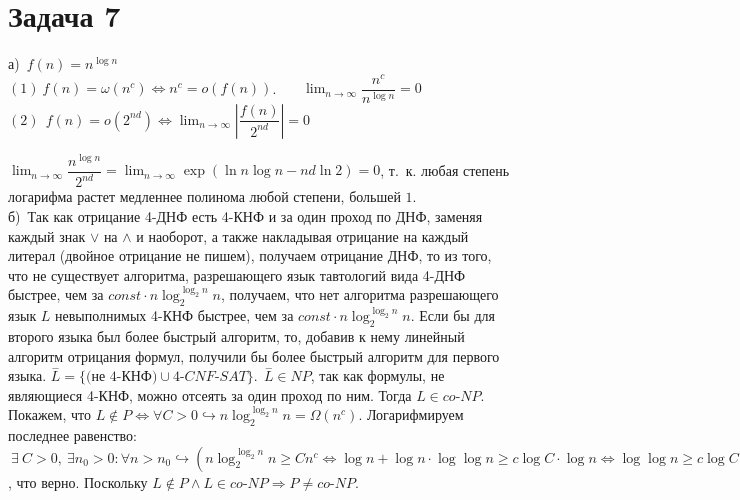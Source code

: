 \documentclass[a4paper,12pt]{article} %
\begin{document}
\section*{Задача 7}
а)~$f(n) = n^{\log{n}}$\\
$(1)~f(n) = \omega(n^c) \Leftrightarrow n^c = o(f(n))$.  ~~~$\lim_{n\rightarrow \infty}{\dfrac{n^c}{n^{\log{n}}} = 0}$\\

\noindent $
(2)~~f(n) = o(2^{nd}) \Leftrightarrow \lim_{n\rightarrow \infty}{\left\vert\dfrac{f(n)}{2^{nd}}\right\vert} = 0 
$

\noindent $\lim_{n\rightarrow \infty}{\dfrac{n^{\log{n}}}{2^{nd}}} = \lim_{n\rightarrow \infty}\exp(\ln{n}\log{n}-nd\ln{2}) = 0$, т.~к. любая степень логарифма растет медленнее полинома любой степени, большей $1$.\\  

\noindent б)~Так как отрицание 4-ДНФ есть 4-КНФ и за один проход по ДНФ, заменяя каждый знак $\vee$ на $\wedge$ и наоборот, а также накладывая отрицание на каждый литерал (двойное отрицание не пишем), получаем отрицание ДНФ, то из того, что не существует алгоритма, разрешающего язык тавтологий вида 4-ДНФ быстрее, чем за $const\cdot n\log_2^{\log_2{n}}{n}$, получаем, что нет алгоритма разрешающего язык $L$ невыполнимых 4-КНФ быстрее, чем за $const\cdot n\log_2^{\log_2{n}}{n}$. Если бы для второго языка был более быстрый алгоритм, то, добавив к нему линейный алгоритм отрицания формул, получили бы более быстрый алгоритм для первого языка.  
$\overset{-}L = \{\text{(не 4-КНФ)}\cup 4\text{-}CNF\text{-}SAT\}.~~\overset{-}L \in NP$, так как формулы, не являющиеся 4-КНФ, можно отсеять за один проход по ним. Тогда $L \in co\text{-}NP$. Покажем, что $L\notin P \Leftrightarrow \forall C > 0 \hookrightarrow n\log_2^{\log_2{n}}{n} = \Omega(n^c)$. Логарифмируем последнее равенство: $~ \exists~ C > 0,~ \exists n_0>0: \forall n > n_0 \hookrightarrow (n\log_2^{\log_2{n}}{n} \geq 
Cn^c \Leftrightarrow \log{n}+\log{n}\cdot\log{\log{n}} \geq c\log{C}\cdot\log{n} \Leftrightarrow \log{\log{n}} \geq c\log{C}-1)$, что верно. Поскольку $L \notin P \wedge L \in co\text{-}NP \Rightarrow P \neq co\text{-}NP$.\\
\end{document}
